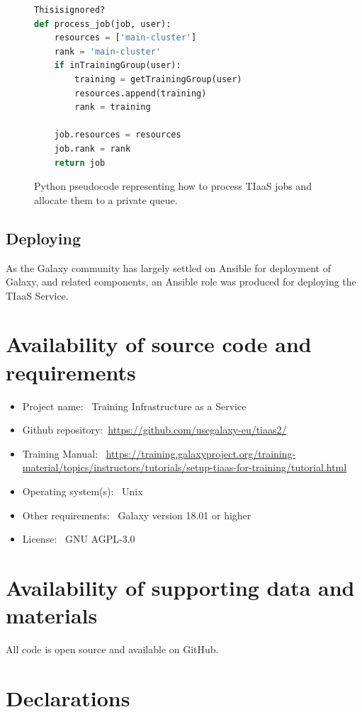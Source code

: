 \documentclass[a4paper,num-refs]{oup-contemporary}
\begin{document}
\begin{figure}[!ht]
\centering
\begin{lstlisting}[frame=single,language=Python]  % Start your code-block
Thisisignored?
def process_job(job, user):
    resources = ['main-cluster']
    rank = 'main-cluster'
    if inTrainingGroup(user):
        training = getTrainingGroup(user)
        resources.append(training)
        rank = training

    job.resources = resources
    job.rank = rank
    return job
\end{lstlisting}
\caption{Python pseudocode representing how to process TIaaS jobs and allocate them to a private queue.\label{code:scheduler}}
\end{figure}

\subsection{Deploying}
As the Galaxy community has largely settled on Ansible for deployment of Galaxy, and related components, an Ansible role was produced for deploying the TIaaS Service.

\section{Availability of source code and requirements}

\begin{itemize}
\item Project name: ~Training Infrastructure as a Service
\item Github repository:~\url{https://github.com/usegalaxy-eu/tiaas2/}
\item Training Manual: ~\url{https://training.galaxyproject.org/training-material/topics/instructors/tutorials/setup-tiaas-for-training/tutorial.html}
\item Operating system(s): ~Unix
\item Other requirements: ~Galaxy version 18.01 or higher
\item License: ~GNU AGPL-3.0
\end{itemize}

\section{Availability of supporting data and materials}
All code is open source and available on GitHub.

\section{Declarations}
\end{document}
